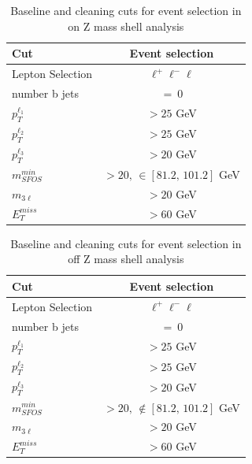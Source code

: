 \documentclass[11pt, oneside]{article}
\begin{document}
\begin{table}[H]
\begin{center}
\begin{tabular}{l | c}
\toprule
Cut 				& Event selection \\
\hline
Lepton Selection 	& $\ell^{+} \ell^{-} \ell$ \\
\hline
\hline
number b jets 		& $=\ 0$ \\
\hline
$p_{T}^{\ell_{1}}$	& $> 25$ GeV \\
\hline
$p_{T}^{\ell_{2}}$	& $> 25$ GeV \\
\hline
$p_{T}^{\ell_{3}}$	& $> 20$ GeV \\
\hline
$m_{SFOS}^{min}$ 	& $>20\textrm{, }\in \left[81.2 \textrm{, } 101.2\right]$ GeV \\
\hline 
$m_{3\ell}$		& $> 20$ GeV \\
\hline
$E_{T}^{miss}$		& $> 60$ GeV \\
\bottomrule
\end{tabular}
\end{center}
\caption{Baseline and cleaning cuts for event selection in on Z mass shell analysis}
\label{basepluscleaningonZ}
\end{table}

\begin{table}[H]
\begin{center}
\begin{tabular}{l | c}
\toprule
Cut 				& Event selection \\
\hline
Lepton Selection 	& $\ell^{+} \ell^{-} \ell$ \\
\hline
\hline
number b jets 		& $=\ 0$ \\
\hline
$p_{T}^{\ell_{1}}$	& $> 25$ GeV \\
\hline
$p_{T}^{\ell_{2}}$	& $> 25$ GeV \\
\hline
$p_{T}^{\ell_{3}}$	& $> 20$ GeV \\
\hline
$m_{SFOS}^{min}$ 	& $>20\textrm{, }\notin \left[81.2 \textrm{, } 101.2\right]$ GeV \\
\hline 
$m_{3\ell}$		& $> 20$ GeV \\
\hline
$E_{T}^{miss}$		& $> 60$ GeV \\
\bottomrule
\end{tabular}
\end{center}
\caption{Baseline and cleaning cuts for event selection in off Z mass shell analysis}
\label{basepluscleaningonZ}
\end{table}
\end{document}
